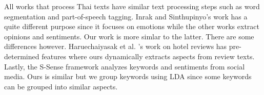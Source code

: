 All works that process Thai texts have similar text processing steps such as word segmentation and part-of-speech tagging. Inrak and Sinthupinyo's work \cite{emotioninthai} has a quite different purpose since it focuses on emotions while the other works \cite{thaiopinionmininghotel,ssense,ssense2} extract opinions and sentiments. Our work is more simlar to the latter. There are some differences however. Haruechaiyasak et al. \cite{thaiopinionmininghotel}'s work on hotel reviews has pre-determined features where ours dynamically extracts aspects from review texts. Lastly, the S-Sense framework \cite{ssense,ssense2} analyzes keywords and sentiments from social media. Ours is similar but we group keywords using LDA since some keywords can be grouped into similar aspects. 



